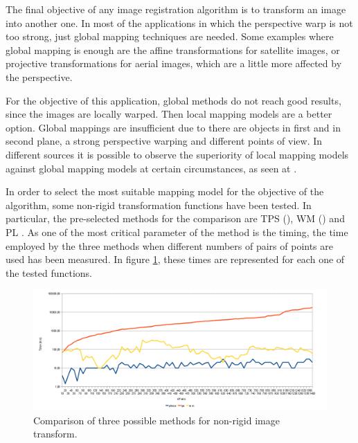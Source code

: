 The final objective of any image registration algorithm is to transform an image into another one. In most of the applications in which the perspective warp is not too strong, just global mapping techniques are needed. Some examples where global mapping is enough are the affine transformations for satellite images, or projective transformations for aerial images, which are a little more affected by the perspective.

For the objective of this application, global methods do not reach good results, since the images are locally warped. Then local mapping models are a better option. Global mappings are insufficient due to there are objects in first and in second plane, a strong perspective warping and different points of view. In different sources it is possible to observe the superiority of local mapping models against global mapping models at certain circumstances, as seen at \cite{goshtasby1988image, ehlers1994high, wiemker1996application, flusser1992adaptive}.

In order to select the most suitable mapping model for the objective of the algorithm, some non-rigid transformation functions have been tested. In particular, the pre-selected methods for the comparison are \ac{TPS} (\cite{harder1972interpolation}), \ac{WM} (\cite{goshtasby1993design}) and \ac{PL} \cite{goshtasby1986piecewise}. As one of the most critical parameter of the method is the timing, the time employed by the three methods when different numbers of pairs of points are used has been measured. In figure \ref{fig:cp01_transform_model_time}, these times are represented for each one of the tested functions.

\begin{figure}[h!]
\centering
\includegraphics[width=\textwidth]{compTransf}
\caption{Comparison of three possible methods for non-rigid image transform.}\label{fig:cp01_transform_model_time}
\end{figure}

